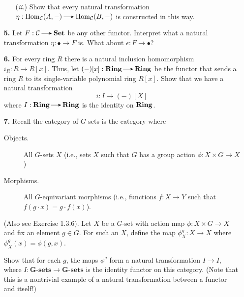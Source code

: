 \begin{itemize}
\begin{itemize}
            \item[(\emph{ii}.)] Show that every natural transformation 
            $\eta:  \hom_{\cc}(A, -)\to \hom_{\cc}(B, -)$ is constructed 
            in this way. 
        \end{itemize}

        \item[\textbf{5.}]
        Let $F: \cc \to \Set$ be any other functor. Interpret what a 
        natural transformation $\eta: \bullet \to F$ is. 
        What about $\epsilon: F \to \bullet$? 

        \item[\textbf{6.}]
        For every ring $R$ there is a natural inclusion homomorphism $i_R: R \to R[x]$.
        Thus, let $(-)[x]: \ring \to \ring$ be the functor that sends a ring 
        $R$ to its single-variable polynomial ring $R[x]$.
        Show that we have a natural transformation 
        \[
            i: I \to (-)[X]
        \]
        where $I: \ring \to \ring$ is the identity on $\operatorname{\mathbf{Ring}}$. 

        \item[\textbf{7.}]
        Recall the category of $G$-sets is the category where 
        \begin{description}
            \item[Objects.] All $G$-sets $X$ (i.e., sets $X$ such that $G$ has a 
            group action $\phi:X \times G \to X$)
            \item[Morphisms.] All $G$-equivariant morphisms (i.e., functions $f:X \to Y$
            such that $f(g \cdot x) = g \cdot f(x)$).
        \end{description}
        (Also see Exercise 1.3.6).
        Let $X$ be a $G$-set with action map $\phi: X \times G \to X$ 
        and fix an element $g \in G$. For such an $X$, define the map 
        $\phi_X^g: X \to X$ where $\phi_X^g(x) = \phi(g, x)$. 

        Show that for each $g$, the maps $\phi^g$ form a natural transformation 
        $I \to I$, where $I: \textbf{G}\textbf{-sets} \to \textbf{G}\textbf{-sets}$ 
        is the identity  functor on this category. (Note that this is a nontrivial example of a natural 
        transformation between a functor and itself!)

    \end{itemize}
    


